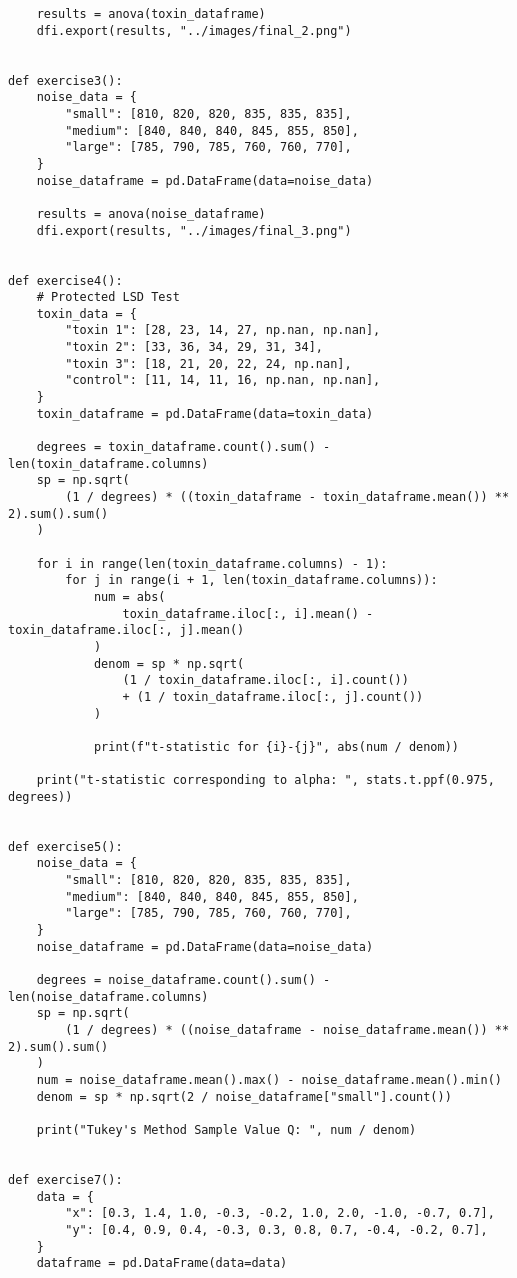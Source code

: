 \documentclass[letterpaper, 12pt]{article}
\begin{document}
\begin{lstlisting}
    results = anova(toxin_dataframe)
    dfi.export(results, "../images/final_2.png")


def exercise3():
    noise_data = {
        "small": [810, 820, 820, 835, 835, 835],
        "medium": [840, 840, 840, 845, 855, 850],
        "large": [785, 790, 785, 760, 760, 770],
    }
    noise_dataframe = pd.DataFrame(data=noise_data)

    results = anova(noise_dataframe)
    dfi.export(results, "../images/final_3.png")


def exercise4():
    # Protected LSD Test
    toxin_data = {
        "toxin 1": [28, 23, 14, 27, np.nan, np.nan],
        "toxin 2": [33, 36, 34, 29, 31, 34],
        "toxin 3": [18, 21, 20, 22, 24, np.nan],
        "control": [11, 14, 11, 16, np.nan, np.nan],
    }
    toxin_dataframe = pd.DataFrame(data=toxin_data)

    degrees = toxin_dataframe.count().sum() - len(toxin_dataframe.columns)
    sp = np.sqrt(
        (1 / degrees) * ((toxin_dataframe - toxin_dataframe.mean()) ** 2).sum().sum()
    )

    for i in range(len(toxin_dataframe.columns) - 1):
        for j in range(i + 1, len(toxin_dataframe.columns)):
            num = abs(
                toxin_dataframe.iloc[:, i].mean() - toxin_dataframe.iloc[:, j].mean()
            )
            denom = sp * np.sqrt(
                (1 / toxin_dataframe.iloc[:, i].count())
                + (1 / toxin_dataframe.iloc[:, j].count())
            )

            print(f"t-statistic for {i}-{j}", abs(num / denom))

    print("t-statistic corresponding to alpha: ", stats.t.ppf(0.975, degrees))


def exercise5():
    noise_data = {
        "small": [810, 820, 820, 835, 835, 835],
        "medium": [840, 840, 840, 845, 855, 850],
        "large": [785, 790, 785, 760, 760, 770],
    }
    noise_dataframe = pd.DataFrame(data=noise_data)

    degrees = noise_dataframe.count().sum() - len(noise_dataframe.columns)
    sp = np.sqrt(
        (1 / degrees) * ((noise_dataframe - noise_dataframe.mean()) ** 2).sum().sum()
    )
    num = noise_dataframe.mean().max() - noise_dataframe.mean().min()
    denom = sp * np.sqrt(2 / noise_dataframe["small"].count())

    print("Tukey's Method Sample Value Q: ", num / denom)


def exercise7():
    data = {
        "x": [0.3, 1.4, 1.0, -0.3, -0.2, 1.0, 2.0, -1.0, -0.7, 0.7],
        "y": [0.4, 0.9, 0.4, -0.3, 0.3, 0.8, 0.7, -0.4, -0.2, 0.7],
    }
    dataframe = pd.DataFrame(data=data)


\end{lstlisting}
\end{document}
